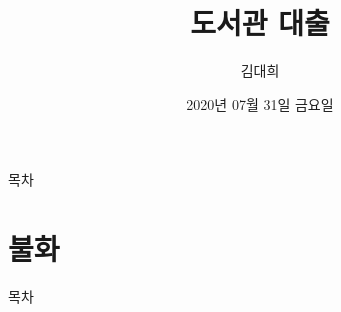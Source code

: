 \documentclass[aspectratio=1610,14pt,xcolor=pdftex,dvipsnames,table,handout]{beamer}
\begin{document}
	

			\title{ 도서관 대출 }
			\author{ 김대희 }
			\date{ 2020년 
					07월 
					31일 
					금요일   }


%
%
%
%


		\begin{frame}[plain]
		\titlepage
		\end{frame}


		\begin{frame} [plain]{목차}
		\tableofcontents%
		\end{frame}




		\part{ 불화 }
		\frame{\partpage}

		\begin{frame} [plain]{목차}
		\tableofcontents%
		\end{frame}
		

\end{document}
